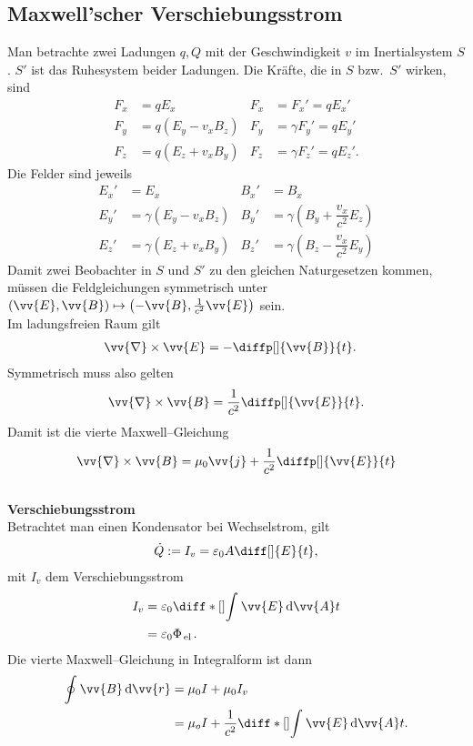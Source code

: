 \documentclass[a4paper,12pt]{article}
\newcommand{\td}{\,\text{d}}
\begin{document}
\subsection{Maxwell'scher Verschiebungsstrom}
Man betrachte zwei Ladungen $q,Q$ mit der Geschwindigkeit $v$ im Inertialsystem $S$. $S'$ ist das Ruhesystem beider Ladungen. Die Kräfte, die in $S$ bzw.\ $S'$ wirken, sind
\begin{align*} 
        F_x&=qE_x&F_x&=F_x'=qE_x'\\
        F_y&=q\left(E_y-v_xB_z\right)&F_y&=\gamma F_y'=qE_y'\\
        F_z&=q\left(E_z+v_xB_y\right)&F_z&=\gamma F_z'=qE_z'
.\end{align*} 
Die Felder sind jeweils
\begin{align*} 
        E_x'&=E_x&B_x'&=B_x\\
        E_y'&=\gamma \left(E_y-v_xB_z\right)&B_y'&=\gamma \left(B_y+\dfrac{v_x}{c^2}E_z\right)\\
        E_z'&=\gamma \left(E_z+v_xB_y\right)&B_z'&=\gamma \left(B_z-\dfrac{v_x}{c^2}E_y\right)
\end{align*} 
Damit zwei Beobachter in $S$ und $S'$ zu den gleichen Naturgesetzen kommen, müssen die Feldgleichungen symmetrisch unter $\left(\vv{E},\vv{B}\right)\mapsto \left(-\vv{B},\tfrac{1}{c^2}\vv{E}\right)$ sein.\\\indent
Im ladungsfreien Raum gilt
\begin{align*} 
        \vv{\nabla }\times \vv{E}&=-\diffp[]{\vv{B}}{t}
.\end{align*} 
Symmetrisch muss also gelten
\begin{align*} 
        \vv{\nabla }\times \vv{B}=\dfrac{1}{c^2}\diffp[]{\vv{E}}{t}
.\end{align*} 
Damit ist die vierte Maxwell--Gleichung
\begin{align*} 
        \vv{\nabla }\times \vv{B}=\mu _0\vv{j}+\dfrac{1}{c^2}\diffp[]{\vv{E}}{t}
\end{align*} 
\hfill\\\textbf{Verschiebungsstrom}\\
Betrachtet man einen Kondensator bei Wechselstrom, gilt
\begin{align*} 
        \dot{Q}:=I_v=\varepsilon _0A\diff[]{E}{t}
,\end{align*} 
mit $I_v$ dem Verschiebungsstrom
\begin{align*} 
        I_v&=\varepsilon _0\diff*[]{\int_{}^{}\vv{E}\td \vv{A}}{t}\\
           &=\varepsilon _0\Phi _{\,\text{el}\,}
.\end{align*} 
Die vierte Maxwell--Gleichung in Integralform ist dann
\begin{align*} 
        \oint_{}^{}\vv{B}\td \vv{r}&=\mu _0I+\mu _0I_v\\
                                   &=\mu _oI+\dfrac{1}{c^2}\diff*[]{\int_{}^{}\vv{E}\td \vv{A}}{t}
.\end{align*} 
\end{document}
